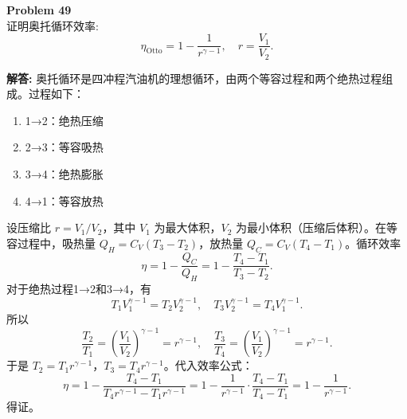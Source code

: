 \documentclass[12pt, a4paper, oneside]{ctexart}
\newenvironment{solution}{\par\noindent\textbf{解答:}\quad}{\par}
\begin{document}
\begin{mdframed}[backgroundcolor=gray!10, linewidth=0pt]
    \textbf{Problem 49} \\
    证明奥托循环效率:
    \[
    \eta_{\text{Otto}} = 1 - \frac{1}{r^{\gamma-1}}, \quad r = \frac{V_1}{V_2}.
    \]
\end{mdframed}
\begin{solution}
    奥托循环是四冲程汽油机的理想循环，由两个等容过程和两个绝热过程组成。过程如下：
    \begin{enumerate}
        \item 1→2：绝热压缩
        \item 2→3：等容吸热
        \item 3→4：绝热膨胀
        \item 4→1：等容放热
    \end{enumerate}
    设压缩比 $r = V_1 / V_2$，其中 $V_1$ 为最大体积，$V_2$ 为最小体积（压缩后体积）。在等容过程中，吸热量 $Q_H = C_V (T_3 - T_2)$，放热量 $Q_C = C_V (T_4 - T_1)$。循环效率
    \[
    \eta = 1 - \frac{Q_C}{Q_H} = 1 - \frac{T_4 - T_1}{T_3 - T_2}.
    \]
    对于绝热过程1→2和3→4，有
    \[
    T_1 V_1^{\gamma-1} = T_2 V_2^{\gamma-1}, \quad T_3 V_2^{\gamma-1} = T_4 V_1^{\gamma-1}.
    \]
    所以
    \[
    \frac{T_2}{T_1} = \left(\frac{V_1}{V_2}\right)^{\gamma-1} = r^{\gamma-1}, \quad
    \frac{T_3}{T_4} = \left(\frac{V_1}{V_2}\right)^{\gamma-1} = r^{\gamma-1}.
    \]
    于是 $T_2 = T_1 r^{\gamma-1}$，$T_3 = T_4 r^{\gamma-1}$。代入效率公式：
    \[
    \eta = 1 - \frac{T_4 - T_1}{T_4 r^{\gamma-1} - T_1 r^{\gamma-1}} = 1 - \frac{1}{r^{\gamma-1}} \cdot \frac{T_4 - T_1}{T_4 - T_1} = 1 - \frac{1}{r^{\gamma-1}}.
    \]
    得证。
\end{solution}
\end{document}
